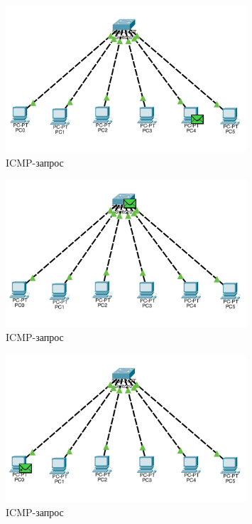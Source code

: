 \documentclass[a4paper, 14pt]{extarticle}
\begin{document}
\begin{figure}[H]
  \centering
  \includegraphics[width=0.8\textwidth]{images/task-1/pdu-2.png}
  \caption{ICMP-запрос}
  \label{fig:task-1:pdu-2}
\end{figure}

\begin{figure}[H]
  \centering
  \includegraphics[width=0.8\textwidth]{images/task-1/pdu-3.png}
  \caption{ICMP-запрос}
  \label{fig:task-1:pdu-3}
\end{figure}

\begin{figure}[H]
  \centering
  \includegraphics[width=0.8\textwidth]{images/task-1/pdu-4.png}
  \caption{ICMP-запрос}
  \label{fig:task-1:pdu-4}
\end{figure}
\end{document}
